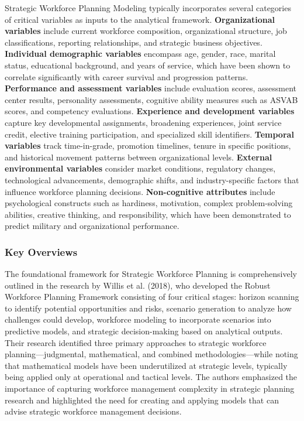 \documentclass[main.tex]{subfiles}
\begin{document}
Strategic Workforce Planning Modeling typically incorporates several categories of critical variables as inputs to the analytical framework. \textbf{Organizational variables} include current workforce composition, organizational structure, job classifications, reporting relationships, and strategic business objectives\parencite{staffany2023,opm2022}. \textbf{Individual demographic variables} encompass age, gender, race, marital status, educational background, and years of service, which have been shown to correlate significantly with career survival and progression patterns\parencite{army_indicators}. \textbf{Performance and assessment variables} include evaluation scores, assessment center results, personality assessments, cognitive ability measures such as ASVAB scores, and competency evaluations\parencite{army_indicators}. \textbf{Experience and development variables} capture key developmental assignments, broadening experiences, joint service credit, elective training participation, and specialized skill identifiers\parencite{army_indicators}. \textbf{Temporal variables} track time-in-grade, promotion timelines, tenure in specific positions, and historical movement patterns between organizational levels\parencite{runn2024,ezugwu2017}. \textbf{External environmental variables} consider market conditions, regulatory changes, technological advancements, demographic shifts, and industry-specific factors that influence workforce planning decisions\parencite{studocu2025}. \textbf{Non-cognitive attributes} include psychological constructs such as hardiness, motivation, complex problem-solving abilities, creative thinking, and responsibility, which have been demonstrated to predict military and organizational performance\parencite{army_indicators}.

\subsubsection{Key Overviews}

The foundational framework for Strategic Workforce Planning is comprehensively outlined in the research by Willis et al. (2018), who developed the Robust Workforce Planning Framework consisting of four critical stages: horizon scanning to identify potential opportunities and risks, scenario generation to analyze how challenges could develop, workforce modeling to incorporate scenarios into predictive models, and strategic decision-making based on analytical outputs\parencite{coursehero2024}. Their research identified three primary approaches to strategic workforce planning—judgmental, mathematical, and combined methodologies—while noting that mathematical models have been underutilized at strategic levels, typically being applied only at operational and tactical levels. The authors emphasized the importance of capturing workforce management complexity in strategic planning research and highlighted the need for creating and applying models that can advise strategic workforce management decisions.
\end{document}
